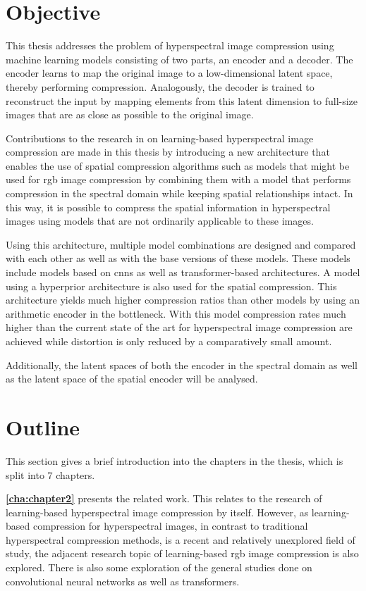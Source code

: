 \section{Objective\label{sec:objective}}
This thesis addresses the problem of hyperspectral image compression using machine learning models consisting of two parts, an encoder and a decoder.
The encoder learns to map the original image to a low-dimensional latent space, thereby performing compression. Analogously, the decoder is trained to reconstruct the input by mapping elements from this latent dimension to full-size images that are as close as possible to the original image.

Contributions to the research in on learning-based hyperspectral image compression are made in this thesis by introducing a new architecture that enables the use of spatial compression algorithms such as models that might be used for \ac{rgb} image compression by combining them with a model that performs compression in the spectral domain while keeping spatial relationships intact. In this way, it is possible to compress the spatial information in hyperspectral images using models that are not ordinarily applicable to these images.

Using this architecture, multiple model combinations are designed and compared with each other as well as with the base versions of these models.
These models include models based on \acp{cnn} as well as transformer-based architectures.
A model using a hyperprior architecture is also used for the spatial compression. This architecture yields much higher compression ratios than other models by using an arithmetic encoder in the bottleneck. With this model compression rates much higher than the current state of the art for hyperspectral image compression are achieved while distortion is only reduced by a comparatively small amount. 

Additionally, the latent spaces of both the encoder in the spectral domain as well as the latent space of the spatial encoder will be analysed.

\section{Outline\label{sec:outline}}
This section gives a brief introduction into the chapters in the thesis, which is split into 7 chapters.

\textbf{\autoref{cha:chapter2}} presents the related work. This relates to the research of learning-based hyperspectral image compression by itself. However, as learning-based compression for hyperspectral images, in contrast to traditional hyperspectral compression methods, is a recent and relatively unexplored field of study, the adjacent research topic of learning-based \ac{rgb} image compression is also explored. There is also some exploration of the general studies done on convolutional neural networks as well as transformers.


